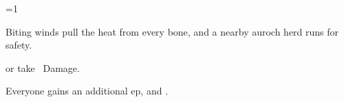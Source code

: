 
\ifnum\value{cycle}=1

  Biting winds pull the heat from every bone, and a nearby auroch herd runs for safety.

  \auroch
  \addtocounter{track}{-4}

   or take ~Damage.

  Everyone gains an additional \gls{ep}, and .

\fi


